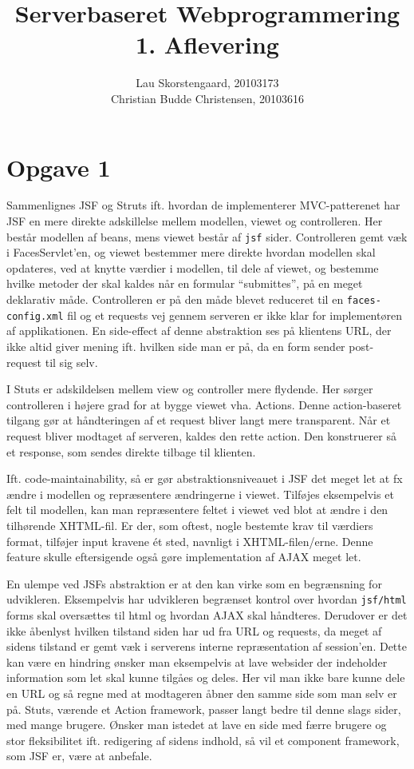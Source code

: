 \documentclass[a4paper,10pt]{article}
\author{Lau Skorstengaard, 20103173 \\Christian Budde Christensen, 20103616}
\title{Serverbaseret Webprogrammering\\1. Aflevering}
\begin{document}
\maketitle
\section*{Opgave 1}
Sammenlignes JSF og Struts ift. hvordan de implementerer MVC-patterenet har JSF en mere direkte adskillelse mellem modellen, viewet og controlleren. Her består modellen af beans, mens viewet består af \texttt{jsf} sider. Controlleren gemt væk i FacesServlet'en, og viewet bestemmer mere direkte hvordan modellen skal opdateres, ved at knytte værdier i modellen, til dele af viewet, og bestemme hvilke metoder der skal kaldes når en formular ``submittes'', på en meget deklarativ måde. Controlleren er på den måde blevet reduceret til en \texttt{faces-config.xml} fil og et requests vej gennem serveren er ikke klar for implementøren af applikationen. En side-effect af denne abstraktion ses på klientens URL, der ikke altid giver mening ift. hvilken side man er på, da en form sender post-request til sig selv.

I Stuts er adskildelsen mellem view og controller mere flydende. Her sørger controlleren i højere grad for at bygge viewet vha. Actions. Denne action-baseret tilgang gør at håndteringen af et request bliver langt mere transparent. Når et request bliver modtaget af serveren, kaldes den rette action. Den konstruerer så et response, som sendes direkte tilbage til klienten.

Ift. code-maintainability, så er gør abstraktionsniveauet i JSF det meget let at fx ændre i modellen og repræsentere ændringerne i viewet. Tilføjes eksempelvis et felt til modellen, kan man repræsentere feltet i viewet ved blot at ændre i den tilhørende XHTML-fil. Er der, som oftest, nogle bestemte krav til værdiers format, tilføjer input kravene ét sted, navnligt i XHTML-filen/erne. Denne feature skulle eftersigende også gøre implementation af AJAX meget let. 

En ulempe ved JSFs abstraktion er at den kan virke som en begrænsning for udvikleren. Eksempelvis har udvikleren begrænset kontrol over hvordan \texttt{jsf/html} forms skal oversættes til html og hvordan AJAX skal håndteres. Derudover er det ikke åbenlyst hvilken tilstand siden har ud fra URL og requests, da meget af sidens tilstand er gemt væk i serverens interne repræsentation af session'en. Dette kan være en hindring ønsker man eksempelvis at lave websider der indeholder information som let skal kunne tilgåes og deles. Her vil man ikke bare kunne dele en URL og så regne med at modtageren åbner den samme side som man selv er på. Stuts, værende et Action framework, passer langt bedre til denne slags sider, med mange brugere. Ønsker man istedet at lave en side med færre brugere og stor fleksibilitet ift. redigering af sidens indhold, så vil et component framework, som JSF er, være at anbefale.
\end{document}
